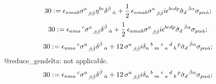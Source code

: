 \documentclass[11pt]{article}
\def\specialcolon{\mathrel{\mathop{:}}\hspace{-.5em}}
\begin{document}
\begin{dmath*}[compact, spread=2pt]
30\specialcolon{}= {\epsilon}_{n m a b} {\sigma}^{a}\,_{\beta \dot{\beta}} {\eta}^{b c} {\delta}^{\dot{\beta}}\,_{\dot{\alpha}} + \frac{1}{2}\, {\epsilon}_{n m a b} {\sigma}^{a}\,_{\beta \dot{\beta}} i {\epsilon}^{b c d p} {\hat{\sigma}}_{d}\,^{\dot{\beta} \alpha} {\sigma}_{p \alpha \dot{\alpha}};
\end{dmath*}
\begin{dmath*}[compact, spread=2pt]
30\specialcolon{}= {\epsilon}_{n m a}\,^{c} {\sigma}^{a}\,_{\beta \dot{\beta}} {\delta}^{\dot{\beta}}\,_{\dot{\alpha}} + \frac{1}{2}\, {\epsilon}_{n m a b} {\sigma}^{a}\,_{\beta \dot{\beta}} i {\epsilon}^{b c d p} {\hat{\sigma}}_{d}\,^{\dot{\beta} \alpha} {\sigma}_{p \alpha \dot{\alpha}};
\end{dmath*}
\begin{dmath*}[compact, spread=2pt]
30\specialcolon{}= {\epsilon}_{n m a}\,^{c} {\sigma}^{a}\,_{\beta \dot{\beta}} {\delta}^{\dot{\beta}}\,_{\dot{\alpha}} + 12\, {\sigma}^{a}\,_{\beta \dot{\beta}} i {\delta}_{n}\,^{b}\,_{m}\,^{c}\,_{a}\,^{d}\,_{b}\,^{p} {\hat{\sigma}}_{d}\,^{\dot{\beta} \alpha} {\sigma}_{p \alpha \dot{\alpha}};
\end{dmath*}
@reduce\_gendelta: not applicable.
\begin{dmath*}[compact, spread=2pt]
30\specialcolon{}= {\epsilon}_{n m a}\,^{c} {\sigma}^{a}\,_{\beta \dot{\beta}} {\delta}^{\dot{\beta}}\,_{\dot{\alpha}} + 12\, {\sigma}^{a}\,_{\beta \dot{\beta}} i {\delta}_{n}\,^{b}\,_{m}\,^{c}\,_{a}\,^{d}\,_{b}\,^{p} {\hat{\sigma}}_{d}\,^{\dot{\beta} \alpha} {\sigma}_{p \alpha \dot{\alpha}};
\end{dmath*}
\end{document}
